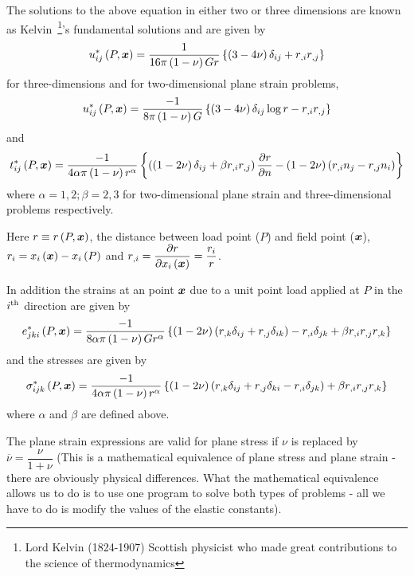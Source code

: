 The solutions to the above equation in either two or three dimensions are
known as Kelvin~\footnote{Lord Kelvin (1824-1907) Scottish physicist who made
  great contributions to the science of thermodynamics}'s fundamental
solutions and are given by
\begin{equation}
   u_{ij}^{*}\left( P, \boldsymbol{x}  \right)  = \dfrac{1}{16\pi\left( 1 - \nu \right)Gr}\left\{ \left( 3
    -4\nu \right) \delta_{ij} + r_{,i}r_{,j} \right\}
  \label{eqn:Kelvin}
\end{equation}
for three-dimensions and for two-dimensional plane strain problems,
\begin{equation}
   u_{ij}^{*}\left( P, \boldsymbol{x}  \right)  = \dfrac{-1}{8\pi\left( 1 -
      \nu \right)G}\left\{ \left( 3 -4\nu \right) \delta_{ij} \log r - r_{,i}r_{,j} \right\}
  \label{eqn:threeD}
\end{equation}
and 
\begin{equation}
   t_{ij}^{*}\left( P, \boldsymbol{x}  \right)  = \dfrac{-1}{4 \alpha \pi\left( 1 - \nu \right)r^{\alpha}}
  \left\{ \left( \left( 1-2\nu \right) \delta_{ij} + \beta r_{,i}r_{,j} \right) 
       \dfrac{\partial r}{\partial n}  - \left( 1-2\nu \right)\left( r_{,i}n_{j} -r_{,j}n_{i} \right) \right\} 
  \label{eqn:twoD}
\end{equation}
where $\alpha = 1,2; \beta = 2,3$ for two-dimensional plane strain and
three-dimensional problems respectively.

Here $r\equiv  r\left( P, \boldsymbol{x}  \right) $, the distance between load point ($P$) and
field point ($ \boldsymbol{x} $), 
$r_{i}  =  x_{i}\left(  \boldsymbol{x}  \right) - x_{i}\left( P \right) $ and
$r_{,i} =  \dfrac{\partial r}{\partial  x_{i}\left(  \boldsymbol{x}  \right) } = \dfrac{r_{i}}{r}$.

In addition the strains at an point $ \boldsymbol{x} $ due to a unit point load applied
at $P$ in the ${i}^{\text{th}}$ direction are given by
\begin{displaymath}
   e_{jki}^{*}\left( P, \boldsymbol{x}  \right)  = \dfrac{-1}{8 \alpha \pi \left( 1-\nu \right)
    Gr^{\alpha}} \left\{ \left( 1-2\nu \right)\left( r_{,k} \delta_{ij} +r_{,j} \delta
    _{ik} \right) - r_{,i} \delta_{jk} + \beta r_{,i} r_{,j}r_{,k} \right\}
\end{displaymath}
and the stresses are given by
\begin{displaymath}
   \sigma_{ijk}^{*}\left( P, \boldsymbol{x}  \right)  = \dfrac{-1}{4 \alpha \pi \left( 1-\nu \right)
    r^{\alpha}} \left\{ \left( 1-2\nu \right)\left( r_{,k} \delta_{ij} +r_{,j} \delta
      _{ki} - r_{,i} \delta_{jk} \right) + \beta r_{,i} r_{,j}r_{,k} \right\}
\end{displaymath}
where $\alpha$ and $\beta$ are defined above.

The plane strain expressions are valid for plane stress if $\nu$ is replaced
by $\overline{\nu} = \dfrac{\nu}{1 + \nu}$ (This is a mathematical equivalence
of plane stress and plane strain - there are obviously physical differences.
What the mathematical equivalence allows us to do is to use one program to
solve both types of problems - all we have to do is modify the values of the
elastic constants).

